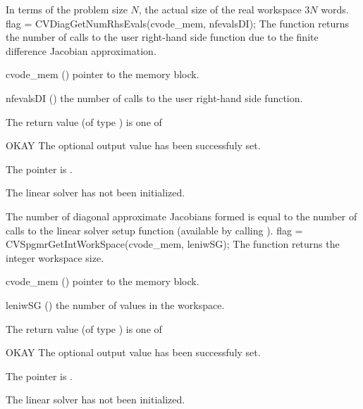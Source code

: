 {
  In terms of the problem size $N$, the actual size of the real workspace
  $3 N$  words.
}
{
  flag = CVDiagGetNumRhsEvals(cvode\_mem, nfevalsDI);
}
{
  The function  returns the
  number of calls to the user right-hand side function due to the 
  finite difference Jacobian approximation.
}
{
  \begin{args}
  \item[cvode\_mem] ()
    pointer to the {\cvode} memory block.
  \item[nfevalsDI] ()
    the number of calls to the user right-hand side function.
  \end{args}
}
{
  The return value  (of type ) is one of
  \begin{args}
  \item[OKAY] 
    The optional output value has been successfuly set.
  \item[\Id{LIN\_NO\_MEM}]
    The  pointer is .
  \item[\Id{LIN\_NO\_LMEM}]
    The {\cvdiag} linear solver has not been initialized.
  \end{args}
}
{
  The number of diagonal approximate Jacobians formed is
  equal to the number of calls to the linear solver setup function
  (available by calling ).
}
%
%
{
  flag = CVSpgmrGetIntWorkSpace(cvode\_mem, leniwSG);
}
{
  The function  returns the
  {\cvspgmr} integer workspace size.
}
{
  \begin{args}
  \item[cvode\_mem] ()
    pointer to the {\cvode} memory block.
  \item[leniwSG] ()
    the number of  values in the {\cvspgmr} workspace.
  \end{args}
}
{
  The return value  (of type ) is one of
  \begin{args}
  \item[OKAY] 
    The optional output value has been successfuly set.
  \item[\Id{LIN\_NO\_MEM}]
    The  pointer is .
  \item[\Id{LIN\_NO\_LMEM}]
    The {\cvspgmr} linear solver has not been initialized.
  \end{args}
}
